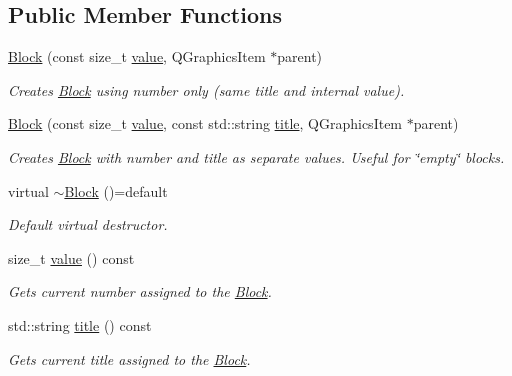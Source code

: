 \subsection*{Public Member Functions}
\begin{DoxyCompactItemize}
\item 
\mbox{\hyperlink{class_block_aa19ca9a93a3cb69f9583c1f5edfd5d26}{Block}} (const size\+\_\+t \mbox{\hyperlink{class_block_ab0b547f273f8d5e4e783ccedaf13ef26}{value}}, Q\+Graphics\+Item $\ast$parent)
\begin{DoxyCompactList}\small\item\em Creates \mbox{\hyperlink{class_block}{Block}} using number only (same title and internal value). \end{DoxyCompactList}\item 
\mbox{\hyperlink{class_block_a91743e5381dcc23971f99db3f1b7607c}{Block}} (const size\+\_\+t \mbox{\hyperlink{class_block_ab0b547f273f8d5e4e783ccedaf13ef26}{value}}, const std\+::string \mbox{\hyperlink{class_block_a48197972162fbfe6b2f4d721d80034cf}{title}}, Q\+Graphics\+Item $\ast$parent)
\begin{DoxyCompactList}\small\item\em Creates \mbox{\hyperlink{class_block}{Block}} with number and title as separate values. Useful for \char`\"{}empty\char`\"{} blocks. \end{DoxyCompactList}\item 
virtual \mbox{\hyperlink{class_block_a7da3fe07e22a8d7f161cc23225b9964f}{$\sim$\+Block}} ()=default
\begin{DoxyCompactList}\small\item\em Default virtual destructor. \end{DoxyCompactList}\item 
size\+\_\+t \mbox{\hyperlink{class_block_ab0b547f273f8d5e4e783ccedaf13ef26}{value}} () const
\begin{DoxyCompactList}\small\item\em Gets current number assigned to the \mbox{\hyperlink{class_block}{Block}}. \end{DoxyCompactList}\item 
std\+::string \mbox{\hyperlink{class_block_a48197972162fbfe6b2f4d721d80034cf}{title}} () const
\begin{DoxyCompactList}\small\item\em Gets current title assigned to the \mbox{\hyperlink{class_block}{Block}}. \end{DoxyCompactList}\item 

\end{DoxyCompactItemize}

